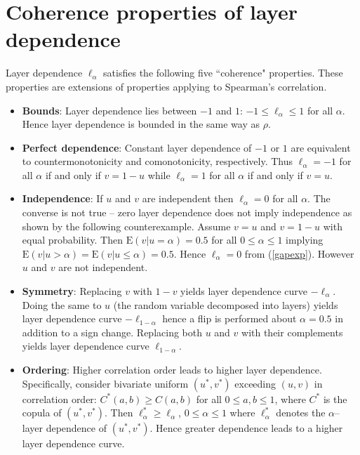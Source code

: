 \documentclass[authoryear]{elsarticle}
\newcommand{\E}{{\mathrm E}}
\newcommand{\eref}[1]{(\ref{#1})}
\begin{document}
\section{Coherence properties of layer dependence}\label{scoherence}


Layer dependence $\ell_\alpha$ satisfies the following five ``coherence" properties. These properties are extensions of properties applying to Spearman's correlation. 
\begin{itemize}

\item \textbf{Bounds}: Layer dependence lies between $-1$ and $1$: $-1 \le\ell_\alpha \le 1$ for all $\alpha$.
Hence layer dependence is bounded in the same way as $\rho$.

\item \textbf{Perfect dependence}: Constant layer dependence of $-1$ or $1$ are equivalent to countermonotonicity and comonotonicity, respectively. Thus $\ell_\alpha=-1$ for all $\alpha$ if and only if  $v=1-u$ while $\ell_\alpha=1$ for all $\alpha$ if and only if  $v=u$.

\item \textbf{Independence}: If $u$ and $v$ are independent then $\ell_\alpha=0$ for all $\alpha$. The converse is not true -- zero layer dependence does not imply independence as shown by the following counterexample. Assume $v=u$ and $v=1-u$ with equal probability. Then $\E(v|u=\alpha)=0.5$ for all $0\leq \alpha\leq 1$ implying $\E(v|u>\alpha)=\E(v|u\leq\alpha)=0.5$. Hence $\ell_\alpha=0$ from \eref{gapexp}. However $u$ and $v$ are not independent.

\item \textbf{Symmetry}: Replacing $v$ with $1-v$ yields layer dependence curve $-\ell_\alpha$. Doing the same to $u$ (the random variable decomposed into layers) yields layer dependence curve $-\ell_{1-\alpha}$ hence a flip is performed about $\alpha=0.5$ in addition to a sign change. Replacing both $u$ and $v$ with their complements yields layer dependence curve $\ell_{1-\alpha}$.

\item \textbf{Ordering}: Higher correlation order \citep{dhaene2009correlation} leads to higher layer dependence. Specifically, consider bivariate uniform $(u^*,v^*)$ exceeding $(u,v)$ in correlation order: $C^*(a,b)\geq C(a,b)$ for all $0\leq a,b\leq 1$, where $C^*$ is the copula of $(u^*,v^*)$. Then
$\ell^*_\alpha \geq \ell_\alpha$,   $0\leq\alpha\leq 1$ where $\ell_\alpha^*$ denotes the $\alpha$--layer dependence of $(u^*,v^*)$. Hence greater dependence leads to a higher layer dependence curve.

\end{itemize}
\end{document}

